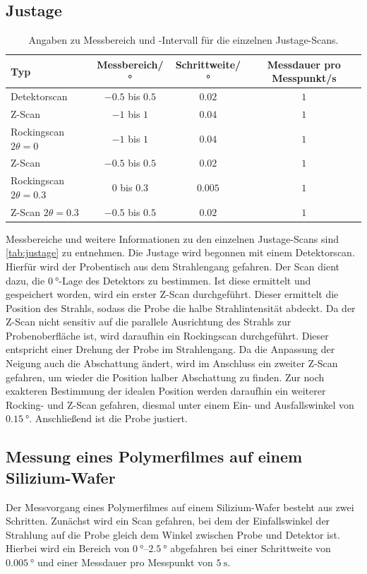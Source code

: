 \subsection{Justage}
\begin{table}[tb]
  \centering
  \caption{Angaben zu Messbereich und -Intervall für die einzelnen Justage-Scans.}
  \begin{tabular}{l c c c}
    \toprule
    Typ & Messbereich/° & Schrittweite/° & Messdauer pro Messpunkt/s \\
    \midrule
    Detektorscan & $\num{-0.5}$ bis $\num{0.5}$ & $\num{0.02}$ & $1$ \\
    Z-Scan & $\num{-1}$ bis $\num{1}$ & $\num{0.04}$ & $1$ \\
    Rockingscan $2\theta = 0$ & $\num{-1}$ bis $\num{1}$ & $\num{0.04}$ & $1$ \\
    Z-Scan & $\num{-0.5}$ bis $\num{0.5}$ & $\num{0.02}$ & $1$ \\
    Rockingscan $2\theta = \num{0.3}$ & $\num{0}$ bis $\num{0.3}$ & $\num{0.005}$ & $1$ \\
    Z-Scan $2\theta = \num{0.3}$ & $\num{-0.5}$ bis $\num{0.5}$ & $\num{0.02}$ & $1$ \\
    \bottomrule
  \end{tabular}
  \label{tab:justage}
\end{table}

Messbereiche und weitere Informationen zu den einzelnen Justage-Scans sind \autoref{tab:justage} zu entnehmen.
Die Justage wird begonnen mit einem Detektorscan.
Hierfür wird der Probentisch aus dem Strahlengang gefahren. Der Scan dient dazu, die $\SI{0}{\degree}$-Lage des Detektors zu bestimmen.
Ist diese ermittelt und gespeichert worden, wird ein erster Z-Scan durchgeführt. Dieser ermittelt die Position des Strahls, sodass die Probe die halbe Strahlintensität abdeckt.
Da der Z-Scan nicht sensitiv auf die parallele Ausrichtung des Strahls zur Probenoberfläche ist, wird daraufhin ein Rockingscan durchgeführt. Dieser entspricht einer Drehung der Probe im Strahlengang.
Da die Anpassung der Neigung auch die Abschattung ändert, wird im Anschluss ein zweiter Z-Scan gefahren, um wieder die Position halber Abschattung zu finden.
Zur noch exakteren Bestimmung der idealen Position werden daraufhin ein weiterer Rocking- und Z-Scan gefahren, diesmal unter einem Ein- und Ausfallswinkel von $\SI{0.15}{\degree}$.
Anschließend ist die Probe justiert.

\subsection{Messung eines Polymerfilmes auf einem Silizium-Wafer}
Der Messvorgang eines Polymerfilmes auf einem Silizium-Wafer besteht aus zwei Schritten. Zunächst wird ein Scan gefahren, bei dem der Einfallswinkel der Strahlung auf die Probe gleich dem Winkel zwischen Probe und Detektor ist. Hierbei wird ein Bereich von $\SIrange{0}{2.5}{\degree}$ abgefahren bei einer Schrittweite von $\SI{0.005}{\degree}$ und einer Messdauer pro Messpunkt von $\SI{5}{\second}$.

